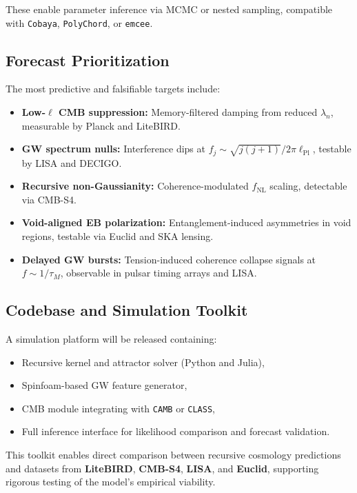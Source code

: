 These enable parameter inference via MCMC or nested sampling, compatible with \texttt{Cobaya}, \texttt{PolyChord}, or \texttt{emcee}.

\subsection{Forecast Prioritization}

The most predictive and falsifiable targets include:

\begin{itemize}
    \item \textbf{Low-\( \ell \) CMB suppression:} Memory-filtered damping from reduced \( \lambda_n \), measurable by Planck and LiteBIRD.
    \item \textbf{GW spectrum nulls:} Interference dips at \( f_j \sim \sqrt{j(j+1)} / 2\pi \ell_{\text{Pl}} \), testable by LISA and DECIGO.
    \item \textbf{Recursive non-Gaussianity:} Coherence-modulated \( f_{\text{NL}} \) scaling, detectable via CMB-S4.
    \item \textbf{Void-aligned EB polarization:} Entanglement-induced asymmetries in void regions, testable via Euclid and SKA lensing.
    \item \textbf{Delayed GW bursts:} Tension-induced coherence collapse signals at \( f \sim 1/\tau_M \), observable in pulsar timing arrays and LISA.
\end{itemize}

\subsection{Codebase and Simulation Toolkit}

A simulation platform will be released containing:

\begin{itemize}
    \item Recursive kernel and attractor solver (Python and Julia),
    \item Spinfoam-based GW feature generator,
    \item CMB module integrating with \texttt{CAMB} or \texttt{CLASS},
    \item Full inference interface for likelihood comparison and forecast validation.
\end{itemize}

This toolkit enables direct comparison between recursive cosmology predictions and datasets from \textbf{LiteBIRD}, \textbf{CMB-S4}, \textbf{LISA}, and \textbf{Euclid}, supporting rigorous testing of the model’s empirical viability.
